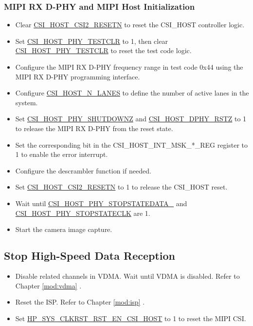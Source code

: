 \documentclass[main\_\_EN.tex]{subfiles}
\begin{document}
\subsubsection{MIPI RX D-PHY and MIPI Host Initialization}
\begin{itemize}
    \item Clear \hyperref[fielddesc:CSIHOSTCSI2RESETN]{CSI\_HOST\_CSI2\_RESETN} to reset the CSI\_HOST controller logic.
    \item Set \hyperref[fielddesc:CSIHOSTPHYTESTCLR]{CSI\_HOST\_PHY\_TESTCLR} to 1, then clear \hyperref[fielddesc:CSIHOSTPHYTESTCLR]{CSI\_HOST\_PHY\_TESTCLR} to reset the test code logic.
    \item Configure the MIPI RX D-PHY frequency range in test code 0x44 using the MIPI RX D-PHY programming interface.
    \item Configure \hyperref[fielddesc:CSIHOSTNLANES]{CSI\_HOST\_N\_LANES} to define the number of active lanes in the system.
    \item Set \hyperref[fielddesc:CSIHOSTPHYSHUTDOWNZ] {CSI\_HOST\_PHY\_SHUTDOWNZ} and \hyperref[fielddesc:CSIHOSTDPHYRSTZ]{CSI\_HOST\_DPHY\_RSTZ} to 1 to release the MIPI RX D-PHY from the reset state.
    \item Set the corresponding bit in the CSI\_HOST\_INT\_MSK\_*\_REG register to 1 to enable the error interrupt.
    \item Configure the descrambler function if needed.
    \item Set \hyperref[fielddesc:CSIHOSTCSI2RESETN]{CSI\_HOST\_CSI2\_RESETN} to 1 to release the CSI\_HOST reset.
    \item Wait until \hyperref[fielddesc:CSIHOSTPHYSTOPSTATEDATA0]{CSI\_HOST\_PHY\_STOPSTATEDATA\_} and \hyperref[fielddesc:CSIHOSTPHYSTOPSTATECLK]{CSI\_HOST\_PHY\_STOPSTATECLK} are 1.
    \item Start the camera image capture.
\end{itemize}

\subsection{Stop High-Speed Data Reception}

\begin{itemize}
    \item Disable related channels in VDMA. Wait until VDMA is disabled. Refer to Chapter \ref{mod:vdma} \textit{}.
    \item Reset the ISP. Refer to Chapter \ref{mod:isp} \textit{}.
    \item Set \hyperref[fielddesc:HPSYSCLKRSTRSTENCSIHOST]{HP\_SYS\_CLKRST\_RST\_EN\_CSI\_HOST} to 1 to reset the MIPI CSI.
\end{itemize}
\end{document}
